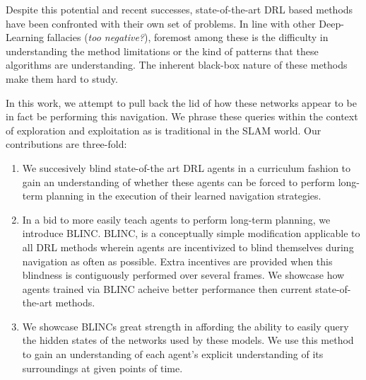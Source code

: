 Despite this potential and recent successes, state-of-the-art DRL based methods have been confronted with their own set of problems. In line with other Deep-Learning fallacies (\textit{too negative?}), foremost among these is the difficulty in understanding the method limitations or the kind of patterns that these algorithms are understanding. The inherent black-box nature of these methods make them hard to study. 

In this work, we attempt to pull back the lid of how these networks appear to be in fact be performing this navigation. We phrase these queries within the context of exploration and exploitation as is traditional in the SLAM world. Our contributions are three-fold:
\begin{enumerate}
\item We succesively blind state-of-the art DRL agents in a curriculum fashion to gain an understanding of whether these agents can be forced to perform long-term planning in the execution of their learned navigation strategies.
\item In a bid to more easily teach agents to perform long-term planning, we introduce BLINC. BLINC, is a conceptually simple modification applicable to all DRL methods wherein agents are incentivized to blind themselves during navigation as often as possible. Extra  incentives are provided when this blindness is contiguously performed over several frames.  We showcase how agents trained via BLINC acheive better performance then current state-of-the-art methods. 
\item We showcase BLINCs great strength in affording the ability to easily query the hidden states of the networks used by these models. We use this method to gain an understanding of each agent's explicit understanding of its surroundings at given points of time.
\end {enumerate}

